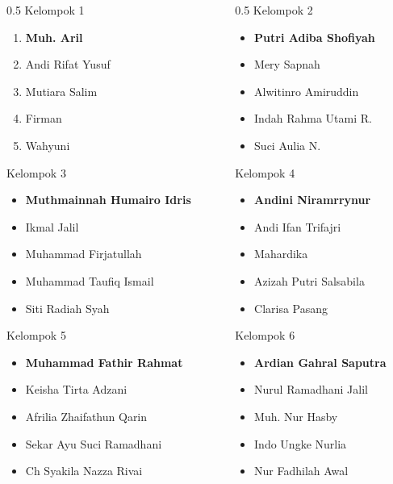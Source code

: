 \documentclass[../main.tex]{subfiles}
\begin{document}
\begin{frame}[mytitle=standard,t,mycolor=digiPH_gray,light]
	\begin{columns}
		\begin{column}{0.5\textwidth}
			Kelompok 1
			\begin{enumerate}
				\item \textbf{Muh. Aril}
				\item Andi Rifat Yusuf
				\item Mutiara Salim
				\item Firman
				\item Wahyuni
			\end{enumerate}
			Kelompok 3
			\begin{itemize}
				\item \textbf{Muthmainnah Humairo Idris}
				\item Ikmal Jalil
				\item Muhammad Firjatullah
				\item Muhammad Taufiq Ismail
				\item Siti Radiah Syah
			\end{itemize}
			Kelompok 5
			\begin{itemize}
				\item \textbf{Muhammad Fathir Rahmat}
				\item Keisha Tirta Adzani
				\item Afrilia Zhaifathun Qarin
				\item Sekar Ayu Suci Ramadhani
				\item Ch Syakila Nazza Rivai
			\end{itemize}



		\end{column}
		\begin{column}{0.5\textwidth}
			Kelompok 2
			\begin{itemize}
				\item \textbf{Putri Adiba Shofiyah}
				\item Mery Sapnah
				\item Alwitinro Amiruddin
				\item Indah Rahma Utami R.
				\item Suci Aulia N.
			\end{itemize}
			Kelompok 4
			\begin{itemize}
				\item \textbf{Andini Niramrrynur}
				\item Andi Ifan Trifajri
				\item Mahardika
				\item Azizah Putri Salsabila
				\item Clarisa Pasang
			\end{itemize}
			Kelompok 6
			\begin{itemize}
				\item \textbf{Ardian Gahral Saputra}
				\item Nurul Ramadhani Jalil
				\item Muh. Nur Hasby
				\item Indo Ungke Nurlia
				\item Nur Fadhilah Awal
			\end{itemize}



\end{column}
\end{columns}
\end{frame}
\end{document}
